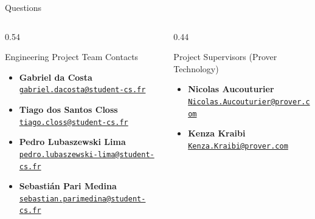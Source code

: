 \documentclass[aspectratio=169,10pt]{beamer}
\begin{document}
\begin{frame}{Questions}{}
  \vspace*{1mm}
  \begin{columns}[c]
    \begin{column}{0.54\textwidth}
      \begin{proverbox}{Engineering Project Team Contacts}
        \fontsize{6.8}{8.4}\selectfont
        \begin{itemize}\setlength{\itemsep}{3pt}
          \item \textbf{\color{DarkText}Gabriel da Costa} \\
            {\fontsize{6}{7.2}\selectfont\color{ProverTeal}\href{mailto:gabriel.dacosta@student-cs.fr}{\texttt{gabriel.dacosta@student-cs.fr}}}
          \item \textbf{\color{DarkText}Tiago dos Santos Closs} \\
            {\fontsize{6}{7.2}\selectfont\color{ProverTeal}\href{mailto:tiago.closs@student-cs.fr}{\texttt{tiago.closs@student-cs.fr}}}
          \item \textbf{\color{DarkText}Pedro Lubaszewski Lima} \\
            {\fontsize{6}{7.2}\selectfont\color{ProverTeal}\href{mailto:pedro.lubaszewski-lima@student-cs.fr}{\texttt{pedro.lubaszewski-lima@student-cs.fr}}}
          \item \textbf{\color{DarkText}Sebastián Pari Medina} \\
            {\fontsize{6}{7.2}\selectfont\color{ProverTeal}\href{mailto:sebastian.parimedina@student-cs.fr}{\texttt{sebastian.parimedina@student-cs.fr}}}
        \end{itemize}
      \end{proverbox}
    \end{column}

    \begin{column}{0.44\textwidth}
      \begin{proverbox}{Project Supervisors (Prover Technology)}
        \fontsize{6.8}{8.4}\selectfont
        \begin{itemize}\setlength{\itemsep}{3pt}
          \item \textbf{\color{DarkText}Nicolas Aucouturier} \\
            {\fontsize{6}{7.2}\selectfont\color{ProverTeal}\href{mailto:Nicolas.Aucouturier@prover.com}{\texttt{Nicolas.Aucouturier@prover.com}}}
          \item \textbf{\color{DarkText}Kenza Kraibi} \\
            {\fontsize{6}{7.2}\selectfont\color{ProverTeal}\href{mailto:Kenza.Kraibi@prover.com}{\texttt{Kenza.Kraibi@prover.com}}}
        \end{itemize}
      \end{proverbox}


\end{column}
\end{columns}
\end{frame}
\end{document}
